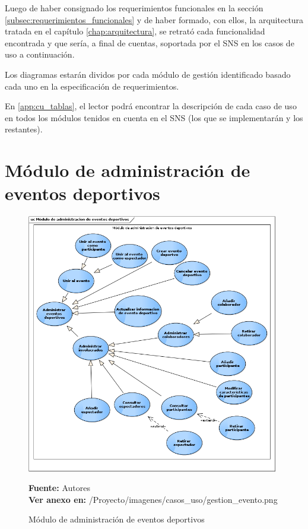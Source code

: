 Luego de haber consignado los requerimientos funcionales en la sección \ref{subsec:requerimientos_funcionales} y de haber formado, con ellos, la arquitectura tratada en el capítulo \ref{chap:arquitectura}, se retrató cada funcionalidad encontrada y que sería, a final de cuentas, soportada por el SNS en los casos de uso a continuación.

Los diagramas estarán dividos por cada módulo de gestión identificado basado cada uno en la especificación de requerimientos.

En \ref{app:cu_tablas}, el lector podrá encontrar la descripción de cada caso de uso en todos los módulos tenidos en cuenta en el SNS (los que se implementarán y los restantes).

\section{Módulo de administración de eventos deportivos}

\begin{figure}[!htb]
  \begin{center}
    \includegraphics[width=11cm]{./imagenes/casos_uso/gestion_evento.png}
    \caption{Módulo de administración de eventos deportivos}
    \label{fig:cu_admin_eve}
    \textbf{Fuente:} Autores \\
    \textbf{Ver anexo en:} /Proyecto/imagenes/casos\_uso/gestion\_evento.png
  \end{center}
\end{figure}

